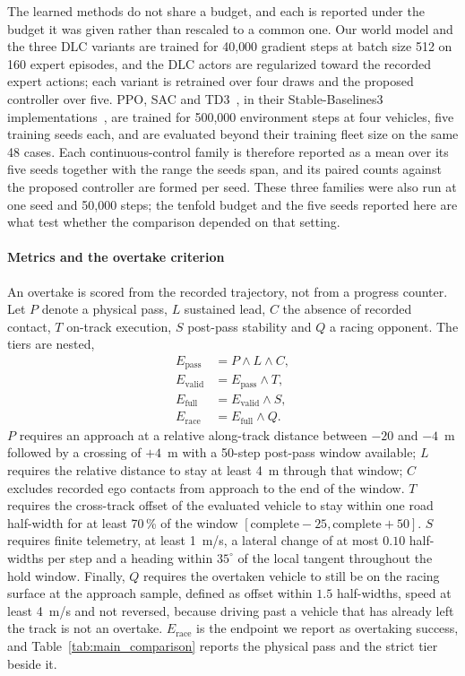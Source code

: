 \documentclass[journal]{IEEEtran}
\begin{document}
The learned methods do not share a budget, and each is reported under the
budget it was given rather than rescaled to a common one. Our world model and
the three DLC variants are trained for 40{,}000 gradient steps at batch size 512
on 160 expert episodes, and the DLC actors are regularized toward the recorded
expert actions; each variant is retrained over four draws and the proposed
controller over five. PPO, SAC and TD3~\cite{schulman2017ppo,haarnoja2018sac,fujimoto2018td3},
in their Stable-Baselines3 implementations~\cite{raffin2021sb3}, are trained for
500{,}000 environment steps at four vehicles, five training seeds each, and are
evaluated beyond their training
fleet size on the same 48 cases. Each continuous-control family is therefore
reported as a mean over its five seeds together with the range the seeds span,
and its paired counts against the proposed controller are formed per seed. These
three families were also run at one seed and 50{,}000 steps; the tenfold budget
and the five seeds reported here are what test whether the comparison depended
on that setting.

\paragraph{Metrics and the overtake criterion}
An overtake is scored from the recorded trajectory, not from a
progress counter. Let $P$ denote a physical pass, $L$ sustained lead, $C$ the
absence of recorded contact, $T$ on-track execution, $S$ post-pass stability and
$Q$ a racing opponent. The tiers are nested,
\begin{equation}
\begin{aligned}
 E_{\mathrm{pass}}&=P\wedge L\wedge C,\\
 E_{\mathrm{valid}}&=E_{\mathrm{pass}}\wedge T,\\
 E_{\mathrm{full}}&=E_{\mathrm{valid}}\wedge S,\\
 E_{\mathrm{race}}&=E_{\mathrm{full}}\wedge Q .
\end{aligned}
\label{eq:graded_endpoint}
\end{equation}
$P$ requires an approach at a relative along-track distance between $-20$ and
$-4$~m followed by a crossing of $+4$~m with a 50-step post-pass window
available; $L$ requires the relative distance to stay at least 4~m through that
window; $C$ excludes recorded ego contacts from approach to the end of the
window. $T$ requires the cross-track offset of the evaluated vehicle to stay within
one road half-width for at least 70\,\% of the window
$[\text{complete}-25,\text{complete}+50]$. $S$ requires finite telemetry, at
least 1~m/s, a lateral change of at most $0.10$ half-widths per step and a
heading within $35^\circ$ of the local tangent throughout the hold window.
Finally, $Q$ requires the overtaken vehicle to still be on the racing surface at
the approach sample, defined as offset within $1.5$ half-widths, speed at least
4~m/s and not reversed, because driving past a vehicle that has already left the track is not
an overtake. $E_{\mathrm{race}}$ is the endpoint we report as
overtaking success, and Table~\ref{tab:main_comparison} reports the physical
pass and the strict tier beside it.
\end{document}
